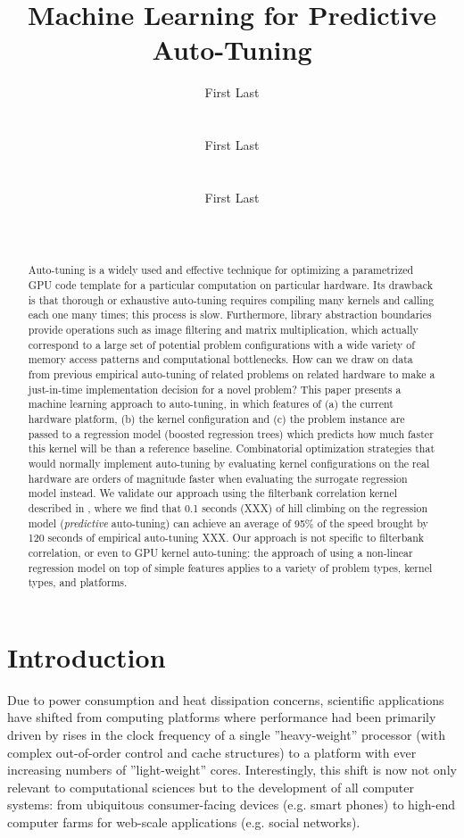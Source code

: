 \documentclass{sig-alternate}
\title{Machine Learning for Predictive Auto-Tuning}
\author{
\alignauthor First Last\\
\affaddr{Affiliation line 1}\\
\affaddr{Affiliation line 2}\\
\email{anon@mail.com}
\alignauthor First Last\\
\affaddr{Affiliation line 1}\\
\affaddr{Affiliation line 2}\\
\email{anon@mail.com}
\alignauthor First Last\\
\affaddr{Affiliation line 1}\\
\affaddr{Affiliation line 2}\\
\email{anon@mail.com}
}
\begin{document}
\maketitle

\begin{abstract}
Auto-tuning is a widely used and effective technique for optimizing a
parametrized GPU code template for a particular computation on particular
hardware.  Its drawback is that thorough or exhaustive auto-tuning requires
compiling many kernels and calling each one many times; this process is slow.
Furthermore, library abstraction boundaries provide operations such as image
filtering and matrix multiplication, which actually correspond to a large set
of potential problem configurations with a wide variety of memory access
patterns and computational bottlenecks.  How can we draw on data from previous
empirical auto-tuning of related problems on related hardware to make a
just-in-time implementation decision for a novel problem?  This paper presents
a machine learning approach to auto-tuning, in which features of (a) the
current hardware platform, (b) the kernel configuration and (c) the problem
instance are passed to a regression model (boosted regression trees) which
predicts how much faster this kernel will be than a reference baseline.
Combinatorial optimization strategies that would normally implement auto-tuning
by evaluating kernel configurations on the real hardware are orders of
magnitude faster when evaluating the surrogate regression model instead.  We
validate our approach using the filterbank correlation kernel described in
\citet{pinto+cox:2011gcg}, where we find that 0.1 seconds (XXX) of hill
climbing on the regression model ({\em predictive} auto-tuning) can achieve an
average of 95\% of the speed brought by 120 seconds of empirical auto-tuning
XXX.  Our approach is not specific to filterbank correlation, or even to GPU
kernel auto-tuning: the approach of using a non-linear regression model on top
of simple features applies to a variety of problem types, kernel types, and
platforms.  \end{abstract}

\section{Introduction}



Due to power consumption and heat dissipation concerns, scientific applications
have shifted from computing platforms where performance had been primarily
driven by rises in the clock frequency of a single ''heavy-weight'' processor
(with complex out-of-order control and cache structures) to a platform with
ever increasing numbers of ''light-weight'' cores. Interestingly, this shift is
now not only relevant to computational sciences but to the development of all
computer systems: from ubiquitous consumer-facing devices (e.g. smart phones) to
high-end computer farms for web-scale applications (e.g. social networks).
\end{document}

